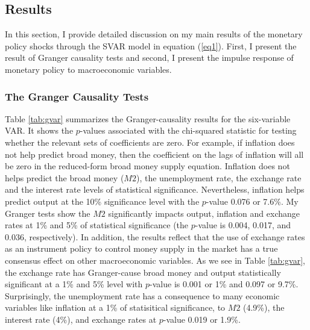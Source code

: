 \documentclass[11pt,letterpaper]{article}
\begin{document}
\subsection{Results} 
In this section, I provide detailed discussion on my main results of the monetary policy shocks through the SVAR model in equation (\ref{eq1}). First, I present the result of Granger causality tests and second, I present the impulse response of monetary policy to macroeconomic variables.  

\subsubsection{The Granger Causality Tests}

Table \ref{tab:gvar} summarizes the Granger-causality results for the six-variable VAR. It shows the $p$-values associated with the chi-squared statistic for testing whether the relevant sets of coefficients are zero. For example, if inflation does not help predict broad money, then the coefficient on the lags of inflation will all be zero in the reduced-form broad money supply equation. Inflation does not helps predict the broad money ($M2$), the unemployment rate, the exchange rate and the interest rate levels of statistical significance. Nevertheless, inflation helps predict output at the 10\% significance level with the $p$-value 0.076 or 7.6\%. My Granger tests show the $M2$ significantly impacts output, inflation and exchange rates at 1\% and 5\% of statistical significance (the $p$-value is 0.004, 0.017, and 0.036, respectively). In addition, the results reflect that the use of exchange rates as an instrument policy to control money supply in the market has a true consensus effect on other macroeconomic variables. As we see in Table \ref{tab:gvar}, the exchange rate has Granger-cause broad money and output statistically significant at a 1\% and 5\% level with $p$-value is 0.001 or 1\% and 0.097 or 9.7\%. Surprisingly, the unemployment rate has a consequence to many economic variables like inflation at a 1\% of statisitical significance, to $M2$ (4.9\%), the interest rate (4\%), and exchange rates at $p$-value 0.019 or 1.9\%. 

    
\end{document}
